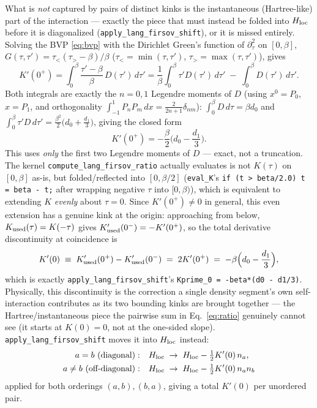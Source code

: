 \documentclass[a4paper,12pt]{article}
\renewcommand{\t}{\ensuremath{\tau}}
\newcommand{\Hloc}{\ensuremath{H_{\rm loc}}}
\begin{document}
What is \emph{not} captured by pairs of distinct kinks is the instantaneous
(Hartree-like) part of the interaction --- exactly the piece that must instead be
folded into $\Hloc$ before it is diagonalized (\texttt{apply\_lang\_firsov\_shift}), or
it is missed entirely. Solving the BVP \eqref{eq:bvp} with the Dirichlet Green's
function of $\partial_\t^2$ on $[0,\beta]$,
$G(\t,\t') = \t_<(\t_>-\beta)/\beta$ ($\t_<=\min(\t,\t')$, $\t_>=\max(\t,\t')$), gives
\begin{equation}
  K'(0^+) = \int_0^\beta \frac{\t'-\beta}{\beta}\, D(\t')\, d\t'
  = \frac1\beta\int_0^\beta \t' D(\t')\,d\t' \;-\; \int_0^\beta D(\t')\,d\t'.
\end{equation}
Both integrals are exactly the $n=0,1$ Legendre moments of $D$ (using
$x^0=P_0$, $x=P_1$, and orthogonality $\int_{-1}^1 P_nP_m\,dx = \tfrac{2}{2n+1}\delta_{nm}$):
$\int_0^\beta D\,d\t = \beta d_0$ and $\int_0^\beta \t' D\,d\t' =
\tfrac{\beta^2}{2}\big(d_0+\tfrac{d_1}{3}\big)$, giving the closed form
\begin{equation}
  K'(0^+) = -\frac{\beta}{2}\Big(d_0 - \frac{d_1}{3}\Big).
  \label{eq:kprime0plus}
\end{equation}
This uses \emph{only} the first two Legendre moments of $D$ --- exact, not a
truncation. The kernel \texttt{compute\_lang\_firsov\_ratio} actually evaluates is not
$K(\t)$ on $[0,\beta]$ as-is, but folded/reflected into $[0,\beta/2]$
(\texttt{eval\_K}'s \texttt{if (t > beta/2.0) t = beta - t;} after wrapping negative
$\t$ into $[0,\beta)$), which is equivalent to extending $K$ \emph{evenly} about
$\t=0$. Since $K'(0^+)\neq0$ in general, this even extension has a genuine kink at the
origin: approaching from below, $K_{\rm used}(\t)=K(-\t)$ gives
$K_{\rm used}'(0^-) = -K'(0^+)$, so the total derivative discontinuity at coincidence
is
\begin{equation}
  K'(0) \;\equiv\; K_{\rm used}'(0^+) - K_{\rm used}'(0^-) \;=\; 2K'(0^+)
  \;=\; -\beta\Big(d_0-\frac{d_1}{3}\Big),
  \label{eq:kprime0}
\end{equation}
which is exactly \texttt{apply\_lang\_firsov\_shift}'s
\verb|Kprime_0 = -beta*(d0 - d1/3)|. Physically, this discontinuity is the
correction a single density segment's own self-interaction contributes as its two
bounding kinks are brought together --- the Hartree/instantaneous piece the pairwise
sum in Eq.~\eqref{eq:ratio} genuinely cannot see (it starts at $K(0)=0$, not at the
one-sided slope). \texttt{apply\_lang\_firsov\_shift} moves it into $\Hloc$ instead:
\begin{align}
  a=b\ (\text{diagonal}): &\quad \Hloc \;\to\; \Hloc - \tfrac12 K'(0)\, n_a, \\
  a\neq b\ (\text{off-diagonal}): &\quad \Hloc \;\to\; \Hloc - \tfrac12 K'(0)\, n_a n_b
\end{align}
applied for both orderings $(a,b),(b,a)$, giving a total $K'(0)$ per unordered pair.
\end{document}
